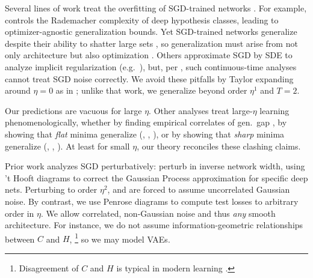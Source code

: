 \documentclass{article}
\theoremstyle{plain}
\theoremstyle{definition}
\begin{document}
    Several lines of work treat the overfitting of SGD-trained networks
    \citep{ne17a}.  For example, \cite{ba17} controls the Rademacher complexity
    of deep hypothesis classes, leading to optimizer-agnostic generalization
    bounds.  Yet SGD-trained networks generalize despite their ability to
    shatter large sets \citep{zh17}, so generalization must arise from not only
    architecture but also optimization \citep{ne17b}.  Others approximate SGD
    by SDE to analyze implicit regularization (e.g.\ \cite{ch18}), but, per
    \cite{ya19a}, such continuous-time analyses cannot treat SGD noise
    correctly.
    We avoid these pitfalls by Taylor expanding around $\eta=0$ as in
    \cite{ro18}; unlike that work, we generalize beyond order $\eta^1$ and
    $T=2$.
    

    Our predictions are vacuous for large $\eta$.  Other analyses treat
    large-$\eta$ learning phenomenologically, whether by finding empirical
    correlates of gen.\ gap \citep{li18}, by showing that \emph{flat} minima
    generalize (\cite{ho17}, \cite{ke17}, \cite{wa18}), or by showing that
    \emph{sharp} minima generalize (\cite{st56}, \cite{di17}, \cite{wu18}).
    At least for small $\eta$, our theory reconciles these clashing claims.
    

    Prior work analyzes SGD perturbatively: \cite{dy19} perturb in inverse
    network width, using 't Hooft diagrams to correct the Gaussian Process
    approximation for specific deep nets.  Perturbing to order $\eta^2$,
    \cite{ch18} and \cite{li17} are forced to assume uncorrelated Gaussian
    noise.  By contrast, we use Penrose diagrams to compute test losses to
    arbitrary order in $\eta$.  We allow correlated, non-Gaussian
    noise and thus \emph{any} smooth architecture.  For instance, we do not
    assume information-geometric relationships between $C$ and $H$,%
    \footnote{
        Disagreement of $C$ and $H$ is typical in modern learning \citep{ro12,
        ku19}.
    }
    so we may model VAEs. 
\end{document}
